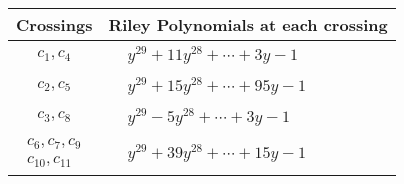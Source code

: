 \documentclass[1p]{elsarticle_modified}
\theoremstyle{definition}
\begin{document}
\begin{tabular}{m{50pt}|m{274pt}}
Crossings & \hspace{64pt}Riley Polynomials at each crossing \\
\hline $$\begin{aligned}c_{1},c_{4}\end{aligned}$$&$\begin{aligned}
&y^{29}+11 y^{28}+\cdots+3 y-1
\end{aligned}$\\
\hline $$\begin{aligned}c_{2},c_{5}\end{aligned}$$&$\begin{aligned}
&y^{29}+15 y^{28}+\cdots+95 y-1
\end{aligned}$\\
\hline $$\begin{aligned}c_{3},c_{8}\end{aligned}$$&$\begin{aligned}
&y^{29}-5 y^{28}+\cdots+3 y-1
\end{aligned}$\\
\hline $$\begin{aligned}c_{6},c_{7},c_{9}\\c_{10},c_{11}\end{aligned}$$&$\begin{aligned}
&y^{29}+39 y^{28}+\cdots+15 y-1
\end{aligned}$\\
\hline
\end{tabular}
\vskip 2pc
\end{document}
